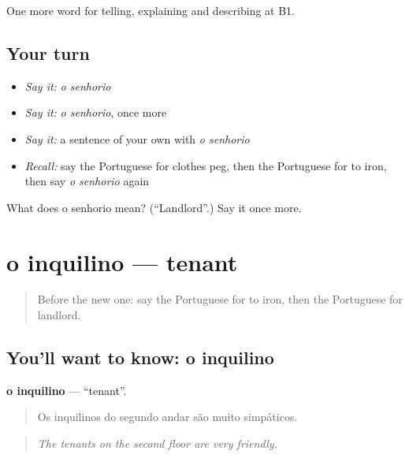 \begin{grammarlens}[title={What you've built}]
One more word for telling, explaining and describing at B1.
\end{grammarlens}

\subsection*{Your turn}
\begin{itemize}
\raggedright
  \item \emph{Say it:} \emph{o senhorio}
  \item \emph{Say it:} \emph{o senhorio}, once more
  \item \emph{Say it:} a sentence of your own with \emph{o senhorio}
  \item \emph{Recall:} say the Portuguese for clothes peg, then the Portuguese for to iron, then say \emph{o senhorio} again
\end{itemize}

\begin{tcolorbox}[breakable,colback=teal!4,colframe=teal!35!black,title={Before you move on}]
What does o senhorio mean? (\textquotedblleft{}Landlord\textquotedblright{}.) Say it once more.
\end{tcolorbox}
\section[o inquilino]{o inquilino — tenant}

\label{lesson:PT-C530-inquilino}



\begin{quote}
Before the new one: say the Portuguese for to iron, then the Portuguese for landlord.
\end{quote}

\subsection*{You'll want to know: o inquilino}
\textbf{o inquilino} — \textquotedblleft{}tenant\textquotedblright{}.

\begin{quote}
Os inquilinos do segundo andar são muito simpáticos.
\end{quote}

\begin{quote}
\emph{The tenants on the second floor are very friendly.}
\end{quote}


